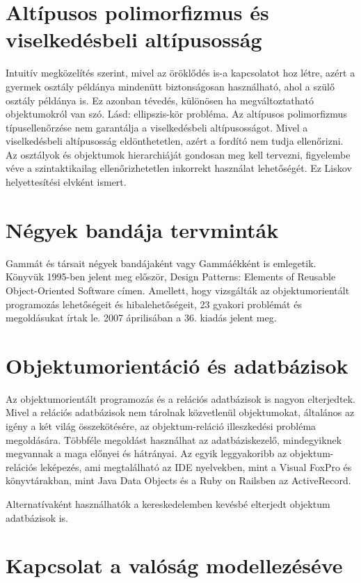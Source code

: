 \documentclass[]{thesis-ekf}
\theoremstyle{definition}
\begin{document}
	\section{Altípusos polimorfizmus és viselkedésbeli altípusosság}
	
	Intuitív megközelítés szerint, mivel az öröklődés is-a kapcsolatot hoz létre, azért a gyermek osztály példánya mindenütt biztonságosan használható, ahol a szülő osztály példánya is. Ez azonban tévedés, különösen ha megváltoztatható objektumokról van szó. Lásd: ellipszis-kör probléma. Az altípusos polimorfizmus típusellenőrzése nem garantálja a viselkedésbeli altípusosságot. Mivel a viselkedésbeli altípusosság eldönthetetlen, azért a fordító nem tudja ellenőrizni. Az osztályok és objektumok hierarchiáját gondosan meg kell tervezni, figyelembe véve a szintaktikailag ellenőrizhetetlen inkorrekt használat lehetőségét. Ez Liskov helyettesítési elvként ismert.
	
	\section{Négyek bandája tervminták}
	
	Gammát és társait négyek bandájaként vagy Gammáékként is emlegetik. Könyvük 1995-ben jelent meg először, Design Patterns: Elements of Reusable Object-Oriented Software címen. Amellett, hogy vizsgálták az objektumorientált programozás lehetőségeit és hibalehetőségeit, 23 gyakori problémát és megoldásukat írtak le. 2007 áprilisában a 36. kiadás jelent meg.
	
	\section{Objektumorientáció és adatbázisok}
	
	Az objektumorientált programozás és a relációs adatbázisok is nagyon elterjedtek. Mivel a relációs adatbázisok nem tárolnak közvetlenül objektumokat, általános az igény a két világ összekötésére, az objektum-reláció illeszkedési probléma megoldására. Többféle megoldást használhat az adatbáziskezelő, mindegyiknek megvannak a maga előnyei és hátrányai.\cite{Neward} Az egyik leggyakoribb az objektum-relációs leképezés, ami megtalálható az IDE nyelvekben, mint a Visual FoxPro és könyvtárakban, mint Java Data Objects és a Ruby on Railsben az ActiveRecord.
	
	Alternatívaként használhatók a kereskedelemben kevésbé elterjedt objektum adatbázisok is.
	
	\section{Kapcsolat a valóság modellezéséve}
	
\end{document}
